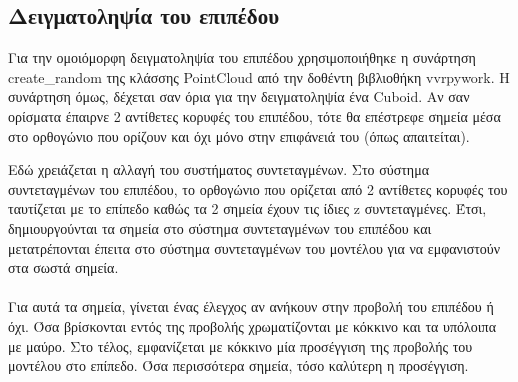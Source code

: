 \documentclass{report}
\begin{document}
\subsection{Δειγματοληψία του επιπέδου}
Για την ομοιόμορφη δειγματοληψία του επιπέδου χρησιμοποιήθηκε η συνάρτηση create\_random της κλάσσης PointCloud από
την δοθέντη βιβλιοθήκη vvrpywork. Η συνάρτηση όμως, δέχεται σαν όρια για την δειγματοληψία ένα Cuboid. Αν σαν ορίσματα έπαιρνε 2 αντίθετες
κορυφές του επιπέδου, τότε θα επέστρεφε σημεία μέσα στο ορθογώνιο που ορίζουν και όχι μόνο στην επιφάνειά του (όπως απαιτείται).


Εδώ χρειάζεται η αλλαγή του συστήματος συντεταγμένων. Στο σύστημα συντεταγμένων του επιπέδου, το ορθογώνιο που ορίζεται από 2 αντίθετες
κορυφές του ταυτίζεται με το επίπεδο καθώς τα 2 σημεία έχουν τις ίδιες z συντεταγμένες. Έτσι, δημιουργούνται τα σημεία στο σύστημα συντεταγμένων
του επιπέδου και μετατρέπονται έπειτα στο σύστημα συντεταγμένων του μοντέλου για να εμφανιστούν στα σωστά σημεία.
\\\\
Για αυτά τα σημεία, γίνεται ένας έλεγχος αν ανήκουν στην προβολή του επιπέδου ή όχι. Όσα βρίσκονται εντός της προβολής χρωματίζονται με
κόκκινο και τα υπόλοιπα με μαύρο. Στο τέλος, εμφανίζεται με κόκκινο μία προσέγγιση της προβολής του μοντέλου στο επίπεδο. Όσα περισσότερα
σημεία, τόσο καλύτερη η προσέγγιση.

\end{document}
